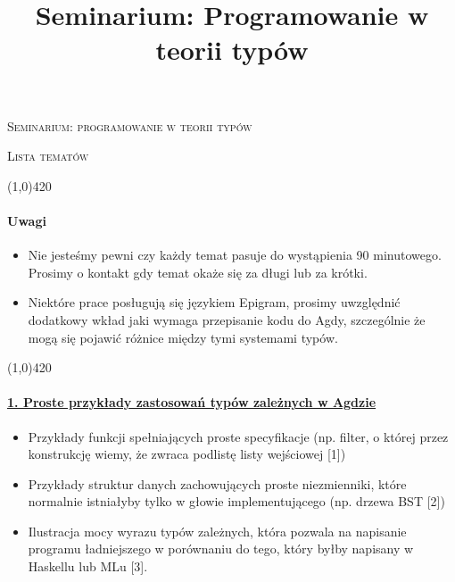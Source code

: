 \documentclass[10pt, a4paper]{article}
\author{}
\title{Seminarium: Programowanie w teorii typów}
\begin{document}
\begin{center}
\begin{LARGE}
\textsc{Seminarium: programowanie w teorii typów}
\end{LARGE}
\end{center}

\begin{center}
\begin{Large}
\textsc{Lista tematów}
\end{Large}
\end{center}

\begin{center}
\line(1,0){420}
\end{center}

\paragraph{Uwagi}

\begin{itemize}
\addtolength{\itemsep}{-0.3\baselineskip}
 \item Nie jesteśmy pewni czy każdy temat pasuje do wystąpienia 90 minutowego. Prosimy o kontakt gdy temat
       okaże się za długi lub za krótki.
 \item Niektóre prace posługują się językiem Epigram, prosimy uwzględnić dodatkowy wkład jaki wymaga przepisanie
       kodu do Agdy, szczególnie że mogą się pojawić różnice między tymi systemami typów.
\end{itemize}
\begin{center}
\line(1,0){420}
\end{center}

\paragraph{\underline{1. Proste przykłady zastosowań typów zależnych w Agdzie}}

\begin{itemize}
\addtolength{\itemsep}{-0.5\baselineskip}
\item
    Przykłady funkcji spełniających proste specyfikacje (np. filter, o której przez konstrukcję wiemy, że zwraca podlistę listy wejściowej [1])
\item
    Przykłady struktur danych zachowujących proste niezmienniki, które normalnie istniałyby tylko w głowie implementującego (np. drzewa BST [2])
\item
    Ilustracja mocy wyrazu typów zależnych, która pozwala na napisanie programu ładniejszego w porównaniu do tego, który byłby napisany w Haskellu lub MLu [3].

\end{itemize}
\end{document}
